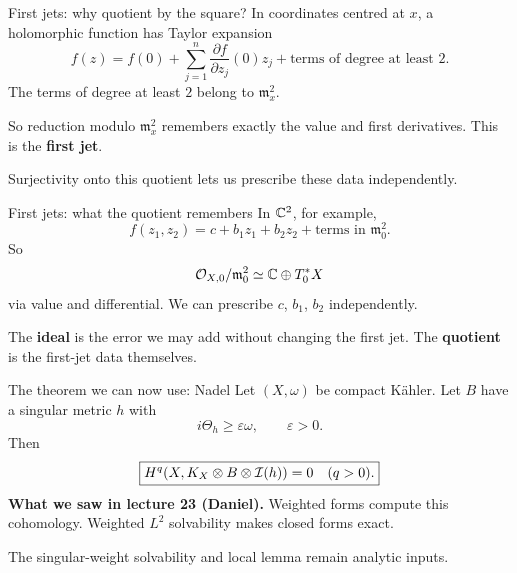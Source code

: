 \begin{frame}{First jets: why quotient by the square?}
In coordinates centred at \(x\), a holomorphic function has Taylor expansion
\[
f(z)=f(0)+\sum_{j=1}^n\frac{\partial f}{\partial z_j}(0)z_j
       +\text{terms of degree at least }2.
\]
The terms of degree at least \(2\) belong to \(\mathfrak m_x^2\).
\par\medskip
So reduction modulo \(\mathfrak m_x^2\) remembers exactly the value and first derivatives. This is the \textbf{first jet}.
\par\medskip
Surjectivity onto this quotient lets us prescribe these data independently.
\end{frame}

\begin{frame}{First jets: what the quotient remembers}
In \(\mathbb C^2\), for example,
\[
f(z_1,z_2)=c+b_1z_1+b_2z_2+\text{terms in }\mathfrak m_0^2.
\]
So
\[
\mathcal O_{X,0}/\mathfrak m_0^2\simeq\mathbb C\oplus T_0^*X
\]
via value and differential. We can prescribe \(c\), \(b_1\), \(b_2\) independently.
\par\medskip
The \textbf{ideal} is the error we may add without changing the first jet. The \textbf{quotient} is the first-jet data themselves.
\end{frame}

\begin{frame}{The theorem we can now use: Nadel}
Let \((X,\omega)\) be compact Kähler. Let \(B\) have a singular metric \(h\) with
\[
i\Theta_h\ge\varepsilon\omega,\qquad\varepsilon>0.
\]
Then
\[
\boxed{H^q(X,K_X\otimes B\otimes\mathcal I(h))=0\quad(q>0).}
\]
\textbf{What we saw in lecture 23 (Daniel).} Weighted forms compute this cohomology. Weighted \(L^2\) solvability makes closed forms exact.
\par\smallskip
The singular-weight solvability and local lemma remain analytic inputs.
\end{frame}

